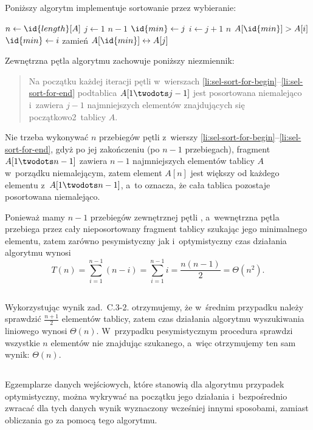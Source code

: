 \subsection{} %
Poniższy algorytm implementuje sortowanie przez wybieranie:
\begin{codebox}
\li	$n\gets\id{length}[A]$
\li	\For $j\gets1$ \To $n-1$ \label{li:sel-sort-for-begin}
\li		\Do
			$\id{min}\gets j$
\li			\For $i\gets j+1$ \To $n$
\li				\Do
					\If $A[\id{min}]>A[i]$
\li						\Then
							$\id{min}\gets i$
						\End
				\End
\li			zamień $A[\id{min}]\leftrightarrow A[j]$
		\End \label{li:sel-sort-for-end}
\end{codebox}
Zewnętrzna pętla algorytmu zachowuje poniższy niezmiennik:
\begin{quote}
Na początku każdej iteracji pętli  w~wierszach \ref{li:sel-sort-for-begin}--\ref{li:sel-sort-for-end} podtablica $A[1\twodots j-1]$ jest posortowana niemalejąco i~zawiera $j-1$ najmniejszych elementów znajdujących się początkowo2~tablicy $A$.
\end{quote}

Nie trzeba wykonywać $n$ przebiegów pętli  z~wierszy \ref{li:sel-sort-for-begin}--\ref{li:sel-sort-for-end}, gdyż po jej zakończeniu (po $n-1$ przebiegach), fragment $A[1\twodots n-1]$ zawiera $n-1$ najmniejszych elementów tablicy $A$ w~porządku niemalejącym, zatem element $A[n]$ jest większy od każdego elementu z~$A[1\twodots n-1]$, a~to oznacza, że cała tablica pozostaje posortowana niemalejąco.

Ponieważ mamy $n-1$ przebiegów zewnętrznej pętli , a~wewnętrzna pętla  przebiega przez cały nieposortowany fragment tablicy szukając jego minimalnego elementu, zatem zarówno pesymistyczny jak i~optymistyczny czas działania algorytmu wynosi
\[
	T(n) = \sum_{i=1}^{n-1}(n-i) = \sum_{i=1}^{n-1}i = \frac{n(n-1)}{2} = \Theta(n^2).
\]

\subsection{} %
Wykorzystując wynik zad.~C.3-2. otrzymujemy, że w~średnim przypadku należy sprawdzić $\frac{n+1}{2}$ elementów tablicy, zatem czas działania algorytmu wyszukiwania liniowego wynosi $\Theta(n)$. W~przypadku pesymistycznym procedura sprawdzi wszystkie $n$ elementów nie znajdując szukanego, a~więc otrzymujemy ten sam wynik: $\Theta(n)$.

\subsection{} %
Egzemplarze danych wejściowych, które stanowią dla algorytmu przypadek optymistyczny, można wykrywać na początku jego działania i~bezpośrednio zwracać dla tych danych wynik wyznaczony wcześniej innymi sposobami, zamiast obliczania go za pomocą tego algorytmu.

